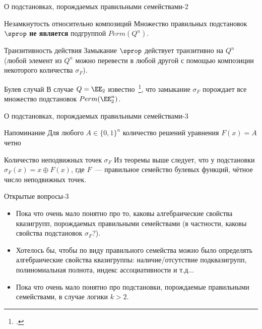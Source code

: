 \begin{frame}{О подстановках, порождаемых правильными семействами-2}
    \begin{alertblock}{Незамкнутость относительно композиций}
        Множество \guillemotleft правильных подстановок\guillemotright $\sprop$ \textbf{не является} подгруппой $Perm(Q^n)$.
    \end{alertblock}
    \pause 
    \begin{alertblock}{Транзитивность действия}
        Замыкание $\sprop$ действует транзитивно на $Q^n$ (любой элемент из $Q^n$ можно перевести в любой другой с помощью композиции некоторого количества $\sigma_{F}$).
    \end{alertblock}
    \pause 
    \begin{block}{Булев случай}
        В случае $Q = \EE_2$ известно~\footcite{USOphd}, что замыкание $\sigma_F$ порождает все множество подстановок $Perm(\EE_2^n)$.
    \end{block}
\end{frame}


\begin{frame}{О подстановках, порождаемых правильными семействами-3}
    \begin{exampleblock}{Напоминание}
        Для любого $A \in \{0, 1\}^n$ количество решений уравнения $F(x) = A$ четно
    \end{exampleblock}
    \pause
    \begin{alertblock}{Количество неподвижных точек $\sigma_F$}
        Из теоремы выше следует, что у подстановки $\sigma_F(x) = x \oplus F(x)$, где $F$~--- правильное семейство булевых функций, чётное число неподвижных точек.
    \end{alertblock}
\end{frame}


\begin{frame}{Открытые вопросы-3}
    \begin{itemize}
        \item Пока что очень мало понятно про то, каковы алгебраические свойства квазигрупп, порождаемых правильными семействами (в частности, каковы свойства подстановок $\sigma_F$?).
        \pause 
        \item Хотелось бы, чтобы по виду правильного семейства можно было определять алгебраические свойства квазигруппы: наличие/отсутствие подквазигрупп, полиномиальная полнота, индекс ассоциативности и т.д...
        \pause 
        \item Пока что очень мало понятно про подстановки, порождаемые правильными семействами, в случае логики $k > 2$.
    \end{itemize}
\end{frame}


